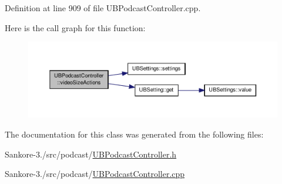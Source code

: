 Definition at line 909 of file U\-B\-Podcast\-Controller.\-cpp.



Here is the call graph for this function\-:
\nopagebreak
\begin{figure}[H]
\begin{center}
\leavevmode
\includegraphics[width=350pt]{d9/def/class_u_b_podcast_controller_af5d4a2dd1ce30bb2e0e460abc71d0e87_cgraph}
\end{center}
\end{figure}




The documentation for this class was generated from the following files\-:\begin{DoxyCompactItemize}
\item 
Sankore-\/3./src/podcast/\hyperlink{_u_b_podcast_controller_8h}{U\-B\-Podcast\-Controller.\-h}\item 
Sankore-\/3./src/podcast/\hyperlink{_u_b_podcast_controller_8cpp}{U\-B\-Podcast\-Controller.\-cpp}\end{DoxyCompactItemize}
